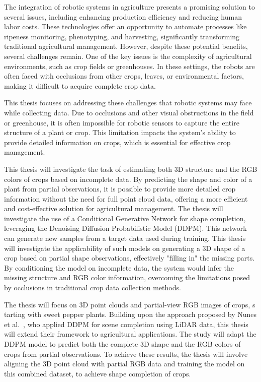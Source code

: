 \documentclass[11pt]{briefcd_3en}
\begin{document}
\begin{letter}{}
\opening{}

The integration of robotic systems in agriculture presents a promising solution to several issues, including enhancing production efficiency and reducing human labor costs. These technologies offer an opportunity to automate processes like ripeness monitoring, phenotyping, and harvesting, significantly transforming traditional agricultural management. However, despite these potential benefits, several challenges remain. One of the key issues is the complexity of agricultural environments, such as crop fields or greenhouses. In these settings, the robots are often faced with occlusions from other crops, leaves, or environmental factors, making it difficult to acquire complete crop data. 

This thesis focuses on addressing these challenges that robotic systems may face while collecting data. Due to occlusions and other visual obstructions in the field or greenhouse, it is often impossible for robotic sensors to capture the entire structure of a plant or crop. This limitation impacts the system's ability to provide detailed information on crops, which is essential for effective crop management. 

This thesis will investigate the task of estimating both 3D structure and the  RGB colors of crops based on incomplete data. 
By predicting the shape 
and color of a plant from partial observations, it is possible to provide more detailed 
crop information without the need for full point cloud data, offering a more efficient 
and cost-effective solution for agricultural management. The thesis will investigate 
the use of a Conditional Generative Network for shape completion, leveraging the 
Denoising Diffusion Probabilistic Model (DDPM). This network can generate new samples from a target data used during training. This thesis will investigate the applicability 
of such models on generating a 3D shape of a crop based on partial 
shape observations, effectively "filling in" the missing parts. 
By conditioning the model on incomplete data, the system would infer 
the missing structure and RGB color information, overcoming the limitations 
posed by occlusions in traditional crop data collection methods.

The thesis will focus on 3D point clouds and partial-view RGB images of crops, s
tarting with sweet pepper plants. Building upon the approach proposed 
by Nunes et al.~\cite{nunes2024cvpr}, who applied DDPM for scene completion using 
LiDAR data, this thesis will extend their framework to agricultural applications. 
The study will adapt the DDPM model to predict both the complete 3D shape and the 
RGB colors of crops from partial observations. To achieve these results, the thesis 
will involve aligning the 3D point cloud with partial RGB data and training the model 
on this combined dataset, to achieve shape completion of crops.



\end{letter}
\end{document}
